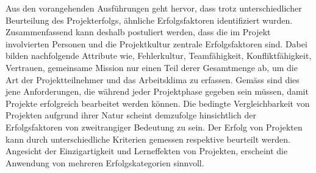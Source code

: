 \newline\newline Aus den vorangehenden Ausführungen geht hervor, dass trotz unterschiedlicher Beurteilung des Projekterfolgs, ähnliche Erfolgsfaktoren identifiziert wurden. Zusammenfassend kann deshalb postuliert werden, dass die im Projekt involvierten Personen und die Projektkultur zentrale Erfolgsfaktoren sind. Dabei bilden nachfolgende Attribute wie, Fehlerkultur, Teamfähigkeit, Konfliktfähigkeit, Vertrauen, gemeinsame Mission nur einen Teil derer Gesamtmenge ab, um die Art der Projektteilnehmer und das Arbeitsklima zu erfassen. Gemäss \citet{alamg16} sind dies jene Anforderungen, die während jeder Projektphase gegeben sein müssen, damit Projekte erfolgreich bearbeitet werden können. Die bedingte Vergleichbarkeit von Projekten aufgrund ihrer Natur scheint demzufolge hinsichtlich der Erfolgsfaktoren von zweitrangiger Bedeutung zu sein. Der Erfolg von Projekten kann durch unterschiedliche Kriterien gemessen respektive beurteilt werden. Angesicht der Einzigartigkeit und Lerneffekten von Projekten, erscheint die Anwendung von mehreren Erfolgskategorien sinnvoll. 
